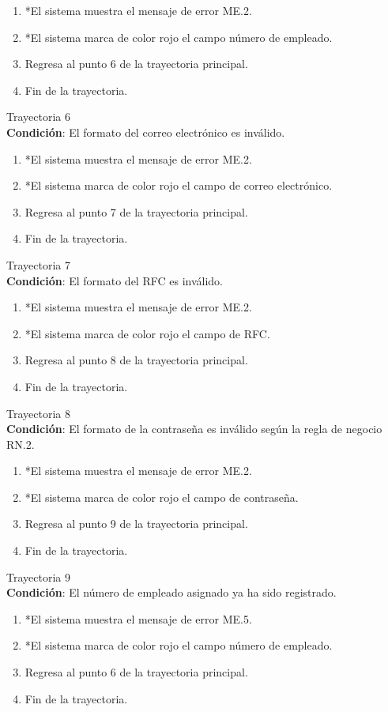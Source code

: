 \begin{enumerate}
    \item *El sistema muestra el mensaje de error ME.2.
    \item *El sistema marca de color rojo el campo número de empleado.
    \item Regresa al punto 6 de la trayectoria principal.
    \item Fin de la trayectoria.
\end{enumerate}
\large{Trayectoria 6}\\
\textbf{Condición}: El formato del correo electrónico es inválido.
\begin{enumerate}
    \item *El sistema muestra el mensaje de error ME.2.
    \item *El sistema marca de color rojo el campo de correo electrónico.
    \item Regresa al punto 7 de la trayectoria principal.
    \item Fin de la trayectoria.
\end{enumerate}
\large{Trayectoria 7}\\
\textbf{Condición}: El formato del RFC es inválido.
\begin{enumerate}
    \item *El sistema muestra el mensaje de error ME.2.
    \item *El sistema marca de color rojo el campo de RFC.
    \item Regresa al punto 8 de la trayectoria principal.
    \item Fin de la trayectoria.
\end{enumerate}
\large{Trayectoria 8}\\
\textbf{Condición}: El formato de la contraseña es inválido según la regla de negocio RN.2.
\begin{enumerate}
    \item *El sistema muestra el mensaje de error ME.2.
    \item *El sistema marca de color rojo el campo de contraseña.
    \item Regresa al punto 9 de la trayectoria principal.
    \item Fin de la trayectoria.
\end{enumerate}
\large{Trayectoria 9}\\
\textbf{Condición}: El número de empleado asignado ya ha sido registrado.
\begin{enumerate}
    \item *El sistema muestra el mensaje de error ME.5.
    \item *El sistema marca de color rojo el campo número de empleado.
    \item Regresa al punto 6 de la trayectoria principal.
    \item Fin de la trayectoria.
\end{enumerate}